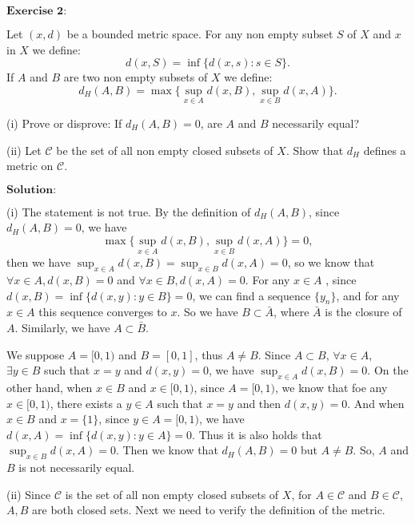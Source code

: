 \documentclass[12pt,a4paper]{ctexart}
\begin{document}
\newpage


$\textbf{Exercise 2:}$

Let $(x, d)$ be a bounded metric space. For any non empty subset $S$ of $X$ and $x$ in $X$ we define:
\begin{equation*}
   d(x, S) = \inf \{d(x, s): s \in S\}.
\end{equation*}
If $A$ and $B$ are two non empty subsets of $X$ we define:
\begin{equation*}
   d_{H}(A, B) = \max \{\sup_{x \in A} d(x, B), \sup_{x \in B} d(x, A) \}.
\end{equation*}

(i) Prove or disprove: If $d_{H}(A, B) = 0$, are $A$ and $B$ necessarily equal?

(ii) Let $\mathcal{C}$ be the set of all non empty closed subsets of $X$. Show that $d_{H}$ defines a metric on $\mathcal{C}$.
  
\vspace{8pt}
$\textbf{Solution:}$

(i) The statement is not true. By the definition of $d_{H}(A, B)$, since $d_{H}(A, B) = 0$, we have
$$\max \{\sup_{x \in A} d(x, B), \sup_{x \in B} d(x, A) \} = 0,$$
then we have $\sup_{x \in A} d(x, B) =  \sup_{x \in B} d(x, A) = 0$, so we know that $\forall x \in A, d(x, B) = 0$ and $\forall x \in B, d(x, A) = 0$. For any $x \in A$
, since $d(x, B) = \inf \{d(x, y): y \in B \} = 0$, we can find a sequence $\{y_{n}\}$, and for any $x \in A$ this sequence converges to $x$. So we have $B \subset \bar{A}$, where $\bar{A}$ is the closure of $A$. Similarly, we have $A \subset \bar{B}$.

We suppose $A = [0, 1)$ and $B = [0, 1]$, thus $A \neq B$. Since $A \subset B$, $\forall x \in A$, $\exists y \in B$ such that $x = y$ and $d(x, y) = 0$, we have $\sup_{x \in A} d(x, B) = 0$. On the other hand, when $x \in B$ and $x \in [0, 1)$, since $A = [0, 1)$, we know that foe any $x \in [0, 1)$, there exists a $y \in A$ such that $x = y$ and then $d(x, y) = 0$. And when $x \in B$ and $x = \{1\}$, since $y \in A = [0, 1)$, we have $d(x, A) = \inf \{d(x, y): y \in A \} = 0$. Thus it is also holds that $\sup_{x \in B} d(x, A) = 0$. Then we know that $d_{H}(A, B) = 0$ but $A \neq B$. So, $A$ and $B$ is not necessarily equal.

\vspace{8pt}

(ii) Since $\mathcal{C}$ is the set of all non empty closed subsets of $X$, for $A \in \mathcal{C}$ and $B \in \mathcal{C}$, $A, B$ are both closed sets. Next we need to verify the definition of the metric.
\end{document}
